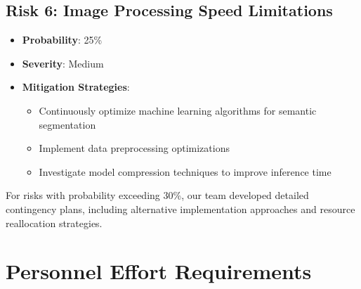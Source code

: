 \subsection{Risk 6: Image Processing Speed Limitations}
\begin{itemize}
\item \textbf{Probability}: 25\%
\item \textbf{Severity}: Medium
\item \textbf{Mitigation Strategies}:
  \begin{itemize}
  \item Continuously optimize machine learning algorithms for semantic segmentation
  \item Implement data preprocessing optimizations
  \item Investigate model compression techniques to improve inference time
  \end{itemize}
\end{itemize}

For risks with probability exceeding 30\%, our team developed detailed contingency plans, including alternative implementation approaches and resource reallocation strategies.

\section{Personnel Effort Requirements}\label{sec:personnel-requirements}

